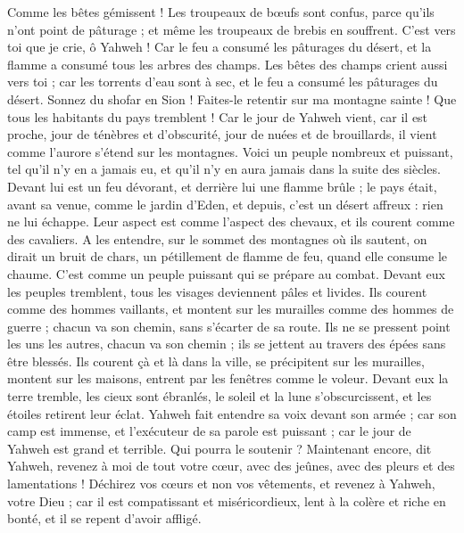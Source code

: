 \begin{multicols}{2}
Comme les bêtes gémissent ! Les troupeaux de bœufs sont confus, parce qu'ils n'ont point de pâturage ; et même les troupeaux de brebis en souffrent.
C’est vers toi que je crie, ô Yahweh ! Car le feu a consumé les pâturages du désert, et la flamme a consumé tous les arbres des champs.
Les bêtes des champs crient aussi vers toi ; car les torrents d’eau sont à sec, et le feu a consumé les pâturages du désert.
\VerseOne{}Sonnez du shofar en Sion ! Faites-le retentir sur ma montagne sainte ! Que tous les habitants du pays tremblent ! Car le jour de Yahweh vient, car il est proche,
jour de ténèbres et d'obscurité, jour de nuées et de brouillards, il vient comme l'aurore s'étend sur les montagnes. Voici un peuple nombreux et puissant, tel qu’il n’y en a jamais eu, et qu’il n’y en aura jamais dans la suite des siècles.
Devant lui est un feu dévorant, et derrière lui une flamme brûle ; le pays était, avant sa venue, comme le jardin d’Eden, et depuis, c’est un désert affreux : rien ne lui échappe.
Leur aspect est comme l’aspect des chevaux, et ils courent comme des cavaliers.
A les entendre, sur le sommet des montagnes où ils sautent, on dirait un bruit de chars, un pétillement de flamme de feu, quand elle consume le chaume. C’est comme un peuple puissant qui se prépare au combat.
Devant eux les peuples tremblent, tous les visages deviennent pâles et livides.
Ils courent comme des hommes vaillants, et montent sur les murailles comme des hommes de guerre ; chacun va son chemin, sans s’écarter de sa route.
Ils ne se pressent point les uns les autres, chacun va son chemin ; ils se jettent au travers des épées sans être blessés.
Ils courent çà et là dans la ville, se précipitent sur les murailles, montent sur les maisons, entrent par les fenêtres comme le voleur.
Devant eux la terre tremble, les cieux sont ébranlés, le soleil et la lune s’obscurcissent, et les étoiles retirent leur éclat.
Yahweh fait entendre sa voix devant son armée ; car son camp est immense, et l'exécuteur de sa parole est puissant ; car le jour de Yahweh est grand et terrible. Qui pourra le soutenir ?
Maintenant encore, dit Yahweh, revenez à moi de tout votre cœur, avec des jeûnes, avec des pleurs et des lamentations !
Déchirez vos cœurs et non vos vêtements, et revenez à Yahweh, votre Dieu ; car il est compatissant et miséricordieux, lent à la colère et riche en bonté, et il se repent d’avoir affligé.

\end{multicols}

